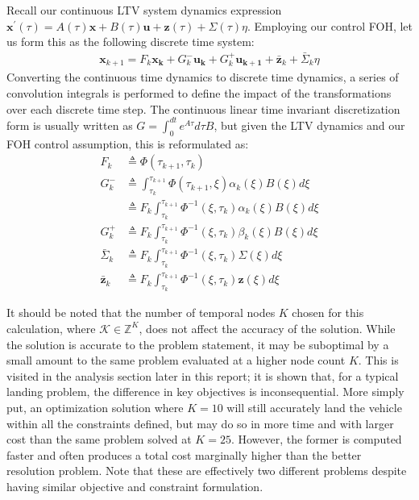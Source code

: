\documentclass[conf]{new-aiaa}
\begin{document}
Recall our continuous LTV system dynamics expression $\mathbf{x}^\prime(\tau) =  A(\tau)\mathbf{x} + B(\tau)\mathbf{u} + \mathbf{z}(\tau) + \Sigma(\tau)\eta$. Employing our control FOH, let us form this as the following discrete time system:
\begin{align}
	\mathbf{x}_{k+1} = F_k\mathbf{x_k} + G^-_k\mathbf{u_k} + G^+_k\mathbf{u_{k+1}} + \bar{\mathbf{z}}_k + \bar{\Sigma}_k\eta
\end{align}
Converting the continuous time dynamics to discrete time dynamics, a series of convolution integrals is performed to define the impact of the transformations over each discrete time step. The continuous linear time invariant discretization form is usually written as $G=\int_{0}^{dt} e^{A \tau} d \tau B$, but given the LTV dynamics and our FOH control assumption, this is reformulated as:
%
\begin{subequations}
\label{disc}
 \begin{align}
 F_k &\triangleq  \Phi(\tau_{k+1},\tau_k)\\
 G^-_k &\triangleq \int_{\tau_k}^{\tau_{k+1}}  \Phi(\tau_{k+1},\xi) \alpha_k(\xi)B(\xi) d\xi\\
 &\triangleq F_k \int_{\tau_k}^{\tau_{k+1}}  \Phi^{-1}(\xi,\tau_{k}) \alpha_k(\xi)B(\xi) d\xi\\
 G^+_k &\triangleq F_k \int_{\tau_k}^{\tau_{k+1}}  \Phi^{-1}(\xi,\tau_{k}) \beta_k(\xi)B(\xi) d\xi\\
 \bar{\Sigma}_k &\triangleq  F_k \int_{\tau_k}^{\tau_{k+1}} \Phi^{-1}(\xi,\tau_{k}) \Sigma(\xi) d\xi\\
 \bar{\mathbf{z}}_k &\triangleq F_k \int_{\tau_k}^{\tau_{k+1}} \Phi^{-1}(\xi,\tau_{k}) \mathbf{z}(\xi) d\xi
\end{align}
\end{subequations}

It should be noted that the number of temporal nodes $K$ chosen for this calculation, where $\mathcal{K} \in \mathbb{Z}^K$, does not affect the accuracy of the solution. While the solution is accurate to the problem statement, it may be suboptimal by a small amount to the same problem evaluated at a higher node count $K$. This is visited in the analysis section later in this report; it is shown that, for a typical landing problem, the difference in key objectives is inconsequential. More simply put, an optimization solution where $K=10$ will still accurately land the vehicle within all the constraints defined, but may do so in more time and with larger cost than the same problem solved at $K=25$. However, the former is computed faster and often produces a total cost marginally higher than the better resolution problem. Note that these are effectively two different problems despite having similar objective and constraint formulation.
\end{document}
